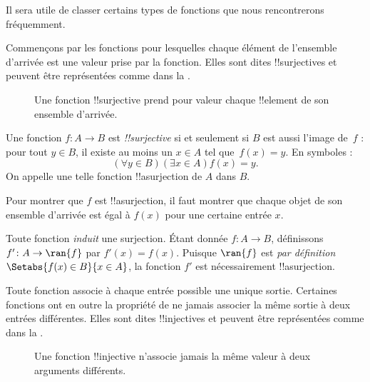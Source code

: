 \documentclass[11pt,a4paper,openany]{memoir}
\begin{document}

\begin{explain}
Il sera utile de classer certains types de fonctions que nous rencontrerons
fréquemment.

Commençons par les fonctions pour lesquelles chaque élément de l’ensemble
d’arrivée est une valeur prise par la fonction. Elles sont dites
!!{surjective}s et peuvent être représentées comme dans la
.

\begin{figure}
  \caption{Une fonction !!{surjective} prend pour valeur chaque
    !!{element} de son ensemble d’arrivée.}
\end{figure}
\end{explain}

\begin{defn}
Une fonction $f \colon A \rightarrow B$ est \emph{!!{surjective}} si et
seulement si $B$ est aussi l’image de~$f$ : pour tout $y \in B$, il existe
au moins un $x \in A$ tel que~$f(x) = y$. En symboles :
\[
  (\forall y \in B)(\exists x \in A)f(x) = y.
\]
On appelle une telle fonction !!a{surjection} de $A$ dans $B$.
\end{defn}

\begin{explain}
Pour montrer que $f$ est !!a{surjection}, il faut montrer que chaque
objet de son ensemble d’arrivée est égal à $f(x)$ pour une certaine
entrée $x$.

Toute fonction \emph{induit} une surjection. Étant donnée
$f \colon A \to B$, définissons $f' \colon A \to \ran{f}$ par
$f'(x) = f(x)$. Puisque $\ran{f}$ est \emph{par définition}
$\Setabs{f(x) \in B}{x \in A}$, la fonction $f'$ est nécessairement
!!a{surjection}.
\end{explain}

\begin{explain}
Toute fonction associe à chaque entrée possible une unique sortie.
Certaines fonctions ont en outre la propriété de ne jamais associer
la même sortie à deux entrées différentes. Elles sont dites
!!{injective}s et peuvent être représentées comme dans la
.
\begin{figure}
  \caption{Une fonction !!{injective} n’associe jamais la même valeur
    à deux arguments différents.}
\end{figure}
\end{explain}
\end{document}
